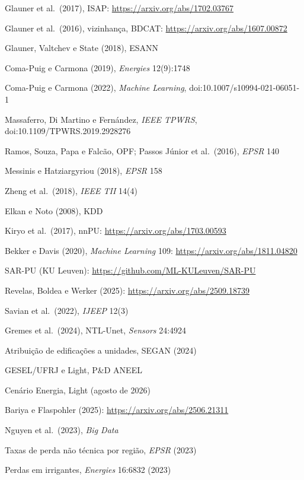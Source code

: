 {\begin{enumerate}[label={[\arabic*]},leftmargin=2.2em,itemsep=1pt]
\item Glauner et al.\ (2017), ISAP: \url{https://arxiv.org/abs/1702.03767}
\item Glauner et al.\ (2016), vizinhança, BDCAT: \url{https://arxiv.org/abs/1607.00872}
\item Glauner, Valtchev e State (2018), ESANN
\item Coma-Puig e Carmona (2019), \emph{Energies} 12(9):1748
\item Coma-Puig e Carmona (2022), \emph{Machine Learning}, doi:10.1007/s10994-021-06051-1
\item Massaferro, Di Martino e Fernández, \emph{IEEE TPWRS}, doi:10.1109/TPWRS.2019.2928276
\item Ramos, Souza, Papa e Falcão, OPF; Passos Júnior et al.\ (2016), \emph{EPSR} 140
\item Messinis e Hatziargyriou (2018), \emph{EPSR} 158
\item Zheng et al.\ (2018), \emph{IEEE TII} 14(4)
\item Elkan e Noto (2008), KDD
\item Kiryo et al.\ (2017), nnPU: \url{https://arxiv.org/abs/1703.00593}
\item Bekker e Davis (2020), \emph{Machine Learning} 109: \url{https://arxiv.org/abs/1811.04820}
\item SAR-PU (KU Leuven): \url{https://github.com/ML-KULeuven/SAR-PU}
\item Revelas, Boldea e Werker (2025): \url{https://arxiv.org/abs/2509.18739}
\item Savian et al.\ (2022), \emph{IJEEP} 12(3)
\item Gremes et al.\ (2024), NTL-Unet, \emph{Sensors} 24:4924
\item Atribuição de edificações a unidades, SEGAN (2024)
\item GESEL/UFRJ e Light, P\&D ANEEL
\item Cenário Energia, Light (agosto de 2026)
\item Bariya e Flaspohler (2025): \url{https://arxiv.org/abs/2506.21311}
\item Nguyen et al.\ (2023), \emph{Big Data}
\item Taxas de perda não técnica por região, \emph{EPSR} (2023)
\item Perdas em irrigantes, \emph{Energies} 16:6832 (2023)
\end{enumerate}}
